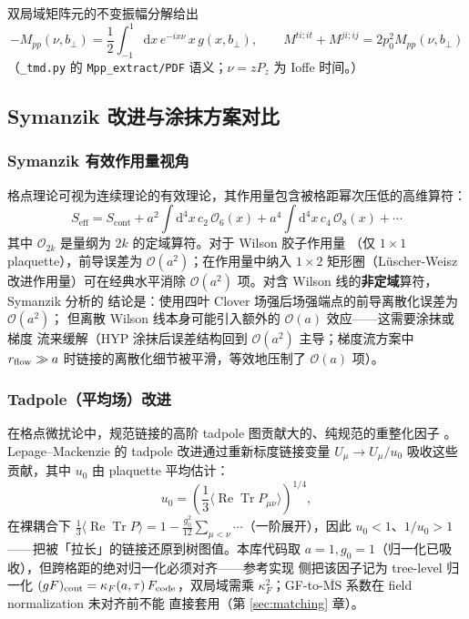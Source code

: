 \documentclass[11pt,a4paper]{ctexart}
\newcommand{\MSbarM}{\overline{\text{MS}}}
\newcommand{\order}[1]{\mathcal{O}(#1)}
\newcommand{\code}[1]{\texttt{#1}}
\newcommand{\bperp}{b_{\perp}}
\begin{document}
双局域矩阵元的不变振幅分解给出
\begin{equation}\label{eq:Mpp-PDF}
-M_{pp}(\nu,\bperp) = \frac12\int_{-1}^{1}\mathrm{d}x\,
e^{-ix\nu}\,x\,g(x,\bperp),
\qquad
M^{ti;it}+M^{ji;ij} = 2p_0^2 M_{pp}(\nu,\bperp)
\end{equation}
（\code{\_tmd.py} 的 \code{Mpp\_extract/PDF} 语义；$\nu=zP_z$ 为 Ioffe
时间。）

\subsection{Symanzik 改进与涂抹方案对比}

\subsubsection{Symanzik 有效作用量视角}

格点理论可视为连续理论的有效理论，其作用量包含被格距幂次压低的高维算符：
\begin{equation}
S_{\text{eff}} = S_{\text{cont}} + a^2 \int \mathrm{d}^4 x \,
c_2\,\mathcal{O}_6(x) + a^4 \int \mathrm{d}^4 x \,
c_4\,\mathcal{O}_8(x) + \cdots
\end{equation}
其中 $\mathcal{O}_{2k}$ 是量纲为 $2k$ 的定域算符。对于 Wilson 胶子作用量
（仅 $1\times1$ plaquette），前导误差为 $\order{a^2}$；在作用量中纳入
$1\times2$ 矩形圈（L\"uscher-Weisz 改进作用量）可在经典水平消除
$\order{a^2}$ 项。对含 Wilson 线的\textbf{非定域}算符，Symanzik 分析的
结论是：使用四叶 Clover 场强后场强端点的前导离散化误差为 $\order{a^2}$；
但离散 Wilson 线本身可能引入额外的 $\order{a}$ 效应——这需要涂抹或梯度
流来缓解（HYP 涂抹后误差结构回到 $\order{a^2}$ 主导；梯度流方案中
$r_{\rm flow}\gg a$ 时链接的离散化细节被平滑，等效地压制了 $\order{a}$
项）。

\subsubsection{Tadpole（平均场）改进}

在格点微扰论中，规范链接的高阶 tadpole 图贡献大的、纯规范的重整化因子
。Lepage--Mackenzie 的 tadpole 改进通过重新标度链接变量
$U_\mu \to U_\mu/u_0$ 吸收这些贡献，其中 $u_0$ 由 plaquette 平均估计：
\begin{equation}
u_0 = \left( \frac{1}{3}
\bigl\langle \operatorname{Re}\operatorname{Tr} P_{\mu\nu} \bigr\rangle
\right)^{1/4},
\end{equation}
在裸耦合下 $\frac13\langle\operatorname{Re}\operatorname{Tr}P\rangle
=1-\frac{g_0^2}{12}\sum_{\mu<\nu}\cdots$（一阶展开），因此
$u_0<1$、$1/u_0>1$——把被「拉长」的链接还原到树图值。本库代码取
$a=1,g_0=1$（归一化已吸收），但跨格距的绝对归一化必须对齐——参考实现
侧把该因子记为 tree-level 归一化
$(gF)_{\rm cont}=\kappa_F(a,\tau)\,F_{\rm code}$，双局域需乘
$\kappa_F^2$；GF-to-$\MSbarM$ 系数在 field normalization 未对齐前不能
直接套用（第 \ref{sec:matching} 章）。
\end{document}
